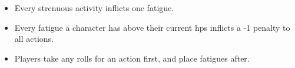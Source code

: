 \begin{itemize}
  \item
  Every strenuous activity inflicts one \gls{fatigue}.
  \item
  Every \gls{fatigue} a character has above their current \glspl{hp} inflicts a -1 penalty to all actions.
  \item
  Players take any rolls for an action first, and place \glspl{fatigue} after.
\end{itemize}

